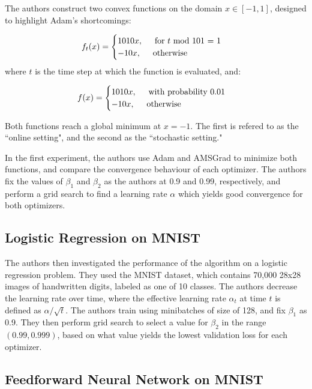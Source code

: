 \documentclass[letterpaper, 10 pt, conference]{ieeeconf}  %
\begin{document}
The authors construct two convex functions on the domain $x \in [-1,1]$, designed to highlight Adam's shortcomings:

\[
    f_{t}(x) = 
    \begin{cases}
     	1010x, \hspace{5mm} \text{for } t \text{ mod 101 = 1} \\
        -10x, \hspace{5mm} \text{otherwise}
    \end{cases}
\]
where $t$ is the time step at which the function is evaluated, and:

\[
    f(x) = 
    \begin{cases}
     	1010x, \hspace{5mm} \text{with probability 0.01}\\
        -10x, \hspace{5mm} \text{otherwise}
    \end{cases}
\]

Both functions reach a global minimum at $x = -1$. The first is refered to as the ``online setting", and the second as the ``stochastic setting."

In the first experiment, the authors use Adam and AMSGrad to minimize both functions, and compare the convergence behaviour of each optimizer. The authors fix the values of  $\beta_{1}$ and $\beta_{2}$ as the authors at 0.9 and 0.99, respectively, and perform a grid search to find a learning rate $\alpha$ which yields good convergence for both optimizers. 

\subsection{Logistic Regression on MNIST}

The authors then investigated the performance of the algorithm on a logistic regression problem. They used the MNIST dataset, which contains 70,000 28x28 images of handwritten digits, labeled as one of 10 classes. The authors decrease the learning rate over time, where the effective learning rate $\alpha_t$ at time $t$ is defined as $\alpha / \sqrt{t}$. The authors train using minibatches of size of 128, and fix  $\beta_{1}$ as 0.9. They then perform grid search to select a value for $\beta_2$ in the range $(0.99, 0.999)$, based on what value yields the lowest validation loss for each optimizer. 

\subsection{Feedforward Neural Network on MNIST}
\end{document}
